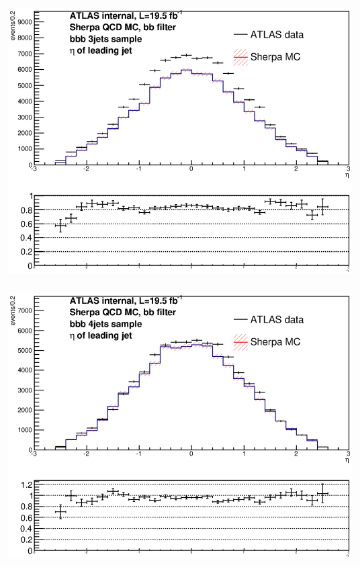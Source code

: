 \begin{figure}[phtb!]
  \begin{center}
  \begin{subfigure}[$bbb$ 3 jet category]{0.3\textwidth}\includegraphics[width=\textwidth]{MonteCarlo/figures/eta0_bbb_3jets.eps}\end{subfigure}
  \begin{subfigure}[$bbb$ 4 jet category]{0.3\textwidth}\includegraphics[width=\textwidth]{MonteCarlo/figures/eta0_bbb_4jets.eps}\end{subfigure}

\end{center}
\end{figure}

